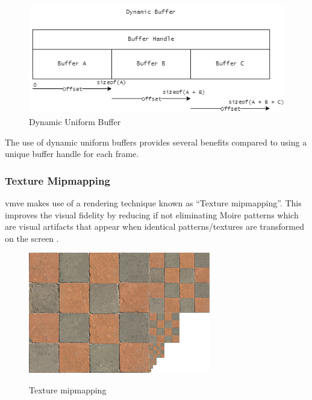 \documentclass[11pt]{article}
\begin{document}
\begin{figure}[H]
  \centering
  \includegraphics[width=\textwidth]{images/dynamic_buffer.png}
  \caption{Dynamic Uniform Buffer}
  \label{fig:dynamic_uniform_buffer}
\end{figure}

The use of dynamic uniform buffers provides several benefits compared to using a
unique buffer handle for each frame.

\subsubsection{Texture Mipmapping}
\gls*{vmve} makes use of a rendering technique known as ``Texture mipmapping''.
This improves the visual fidelity by reducing if not eliminating Moire patterns
which are visual artifacts that appear when identical patterns/textures are
transformed on the screen \cite{moire_pattern}.

\begin{figure}[H]
  \centering
  \includegraphics[width=\textwidth]{images/mipmaps.png}
  \caption{Texture mipmapping}
  \label{fig:texture_mipmapping} \cite{texture_mipmaps}
\end{figure}
\end{document}
